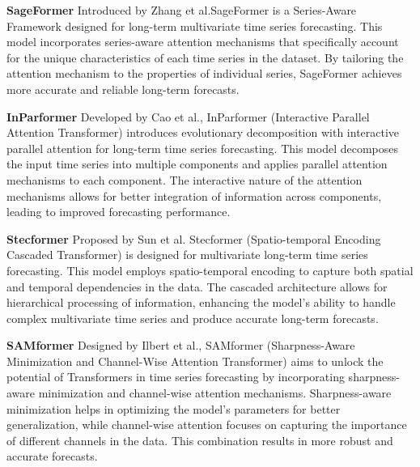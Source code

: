 \noindent\textbf
{SageFormer}
 Introduced by Zhang et al.\cite{zhang2023sageformerseriesawareframeworklongterm}SageFormer is a Series-Aware Framework designed for long-term multivariate time series forecasting. This model incorporates series-aware attention mechanisms that specifically account for the unique characteristics of each time series in the dataset. By tailoring the attention mechanism to the properties of individual series, SageFormer achieves more accurate and reliable long-term forecasts.
\vspace{10pt}


\noindent\textbf
{InParformer}
 Developed by Cao et al.\cite{Cao_Huang_Yao_Wang_He_Wang_2023}, InParformer (Interactive Parallel Attention Transformer) introduces evolutionary decomposition with interactive parallel attention for long-term time series forecasting. This model decomposes the input time series into multiple components and applies parallel attention mechanisms to each component. The interactive nature of the attention mechanisms allows for better integration of information across components, leading to improved forecasting performance.
\vspace{10pt}


\noindent\textbf
{Stecformer}
 Proposed by Sun et al.\cite{sun2023stecformerspatiotemporalencodingcascaded} Stecformer (Spatio-temporal Encoding Cascaded Transformer) is designed for multivariate long-term time series forecasting. This model employs spatio-temporal encoding to capture both spatial and temporal dependencies in the data. The cascaded architecture allows for hierarchical processing of information, enhancing the model’s ability to handle complex multivariate time series and produce accurate long-term forecasts.
\vspace{10pt}


\noindent\textbf
{SAMformer}
 Designed by Ilbert et al.\cite{ilbert2024samformerunlockingpotentialtransformers}, SAMformer (Sharpness-Aware Minimization and Channel-Wise Attention Transformer) aims to unlock the potential of Transformers in time series forecasting by incorporating sharpness-aware minimization and channel-wise attention mechanisms. Sharpness-aware minimization helps in optimizing the model’s parameters for better generalization, while channel-wise attention focuses on capturing the importance of different channels in the data. This combination results in more robust and accurate forecasts.
